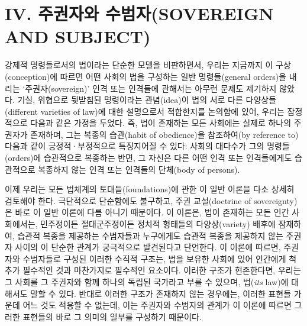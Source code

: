 \section{IV. 주권자와 수범자(SOVEREIGN AND
SUBJECT)}\label{iv.-uxc8fcuxad8cuxc790uxc640-uxc218uxbc94uxc790sovereign-and-subject}

강제적 명령들로서의 법이라는 단순한 모델을 비판하면서, 우리는 지금까지
이 구상(conception)에 따르면 어떤 사회의 법을 구성하는 일반
명령들(general orders)을 내리는 ‘주권자(sovereign)’ 인격 또는 인격들에
관해서는 아무런 문제도 제기하지 않았다. 기실, 위협으로 뒷받침된
명령이라는 관념(idea)이 법의 서로 다른 다양상들(different varieties of
law)에 대한 설명으로서 적합한지를 논의함에 있어, 우리는 잠정적으로
다음과 같은 가정을 두었다. 즉, 법이 존재하는 모든 사회에는 실제로 하나의
주권자가 존재하며, 그는 복종의 습관(habit of obedience)을 참조하여(by
reference to) 다음과 같이 긍정적·부정적으로 특징지어질 수 있다: 사회의
대다수가 그의 명령들(orders)에 습관적으로 복종하는 반면, 그 자신은 다른
어떤 인격 또는 인격들에게도 습관적으로 복종하지 않는 인격 또는 인격들의
단체(body of persons).

이제 우리는 모든 법체계의 토대들(foundations)에 관한 이 일반 이론을 다소
상세히 검토해야 한다. 극단적으로 단순함에도 불구하고, 주권 교설(doctrine
of sovereignty)은 바로 이 일반 이론에 다름 아니기 때문이다. 이 이론은,
법이 존재하는 모든 인간 사회에서는, 민주정이든 절대군주정이든 정치적
형태들의 다양상(variety) 배후에 잠재하여, 습관적 복종을 제공하는
수범자들과 누구에게도 습관적 복종을 제공하지 않는 주권자 사이의 이
단순한 관계가 궁극적으로 발견된다고 단언한다. 이 이론에 따르면, 주권자와
수범자들로 구성된 이러한 수직적 구조는, 법을 보유한 사회에 있어 인간에게
척추가 필수적인 것과 마찬가지로 필수적인 요소이다. 이러한 구조가
현존한다면, 우리는 그 사회를 그 주권자와 함께 하나의 독립된 국가라고
부를 수 있으며,  법(\emph{its} law)에 대해서도 말할 수
있다. 반대로 이러한 구조가 존재하지 않는 경우에는, 이러한 표현들 가운데
어느 것도 적용할 수 없는데, 이는 주권자와 수범자의 관계가 이 이론에
따르면 그러한 표현들의 바로 그 의미의 일부를 구성하기 때문이다.

